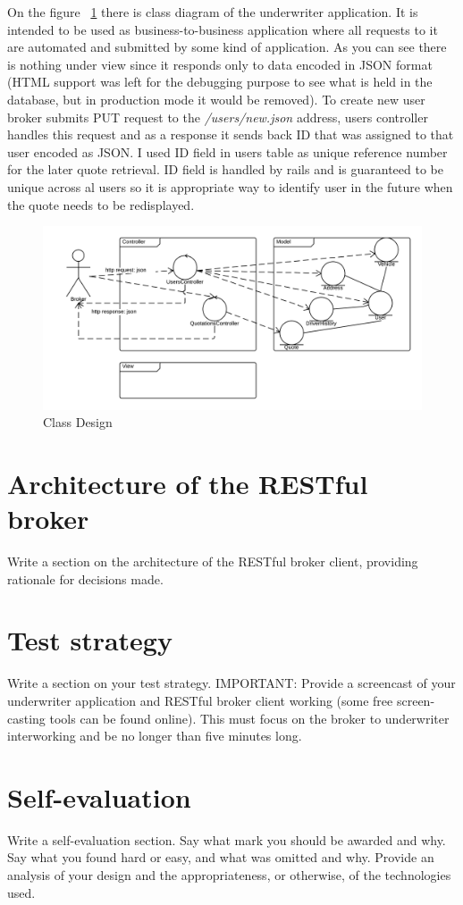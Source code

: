 \documentclass[10pt,a4paper,headinclude=true,twoside]{report}
\begin{document}
On the figure ~\ref{fig:ClassDesign} there is class diagram of the underwriter application. It is intended to be used as business-to-business application where all requests to it are automated and submitted by some kind of application. As you can see there is nothing under view since it responds only to data encoded in JSON format (HTML support was left for the debugging purpose to see what is held in the database, but in production mode it would be removed).  To create new user broker submits PUT request to the \textit{/users/new.json} address, users controller handles this request and as a response it sends back ID that was assigned to that user encoded as JSON. I used ID field in users table as unique reference number for the later quote retrieval. ID field is handled by rails and is guaranteed to be unique across al users so it is appropriate way to identify user in the future when the quote needs to be redisplayed.

\begin{figure}[H]
\centering
\centerline{\includegraphics[scale=0.25]{./ClassDesign}}
\caption{Class Design}
\label{fig:ClassDesign}
\end{figure}


\section{Architecture of the RESTful broker}
Write a section on the architecture of the RESTful broker client,
providing rationale for decisions made.
\section{Test strategy}
Write a section on your test strategy. IMPORTANT: Provide a
screencast of your underwriter application and RESTful broker client
working (some free screen-casting tools can be found online). This
must focus on the broker to underwriter interworking and be no longer
than five minutes long.
\section{Self-evaluation}
Write a self-evaluation section. Say what mark you should be awarded
and why. Say what you found hard or easy, and what was omitted and
why. Provide an analysis of your design and the appropriateness, or
otherwise, of the technologies used.



\end{document}
